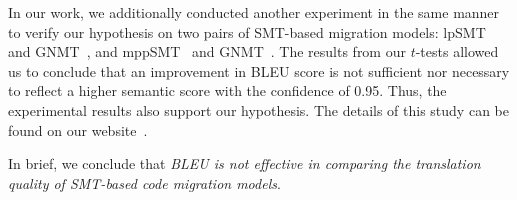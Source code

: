 %
%



In our work, we additionally conducted another experiment in the same
manner to verify our hypothesis on two pairs of SMT-based migration
models: lpSMT~\cite{fse13} and GNMT~\cite{gnmt}, and
mppSMT~\cite{ase15} and GNMT~\cite{gnmt}. The results from our
$t$-tests allowed us to conclude that an improvement in BLEU score is
not sufficient nor necessary to reflect a higher semantic score with
the confidence of 0.95. Thus, the experimental results also support
our hypothesis. The details of this study can be found on our
website~\cite{ruby-website}.

In brief, we conclude that \textit{BLEU is not effective in comparing
  the translation quality of SMT-based code migration models}.

